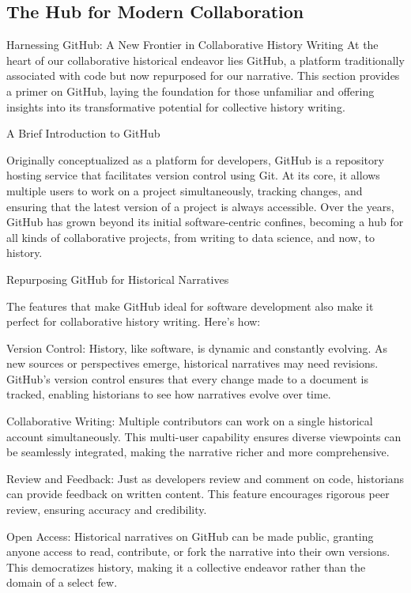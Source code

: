\documentclass[a4paper,12pt]{book}
\begin{document}
\subsection*{The Hub for Modern Collaboration}
Harnessing GitHub: A New Frontier in Collaborative History Writing
At the heart of our collaborative historical endeavor lies GitHub, a platform traditionally associated with code but now repurposed for our narrative. This section provides a primer on GitHub, laying the foundation for those unfamiliar and offering insights into its transformative potential for collective history writing.

A Brief Introduction to GitHub

Originally conceptualized as a platform for developers, GitHub is a repository hosting service that facilitates version control using Git. At its core, it allows multiple users to work on a project simultaneously, tracking changes, and ensuring that the latest version of a project is always accessible. Over the years, GitHub has grown beyond its initial software-centric confines, becoming a hub for all kinds of collaborative projects, from writing to data science, and now, to history.

Repurposing GitHub for Historical Narratives

The features that make GitHub ideal for software development also make it perfect for collaborative history writing. Here's how:

Version Control: History, like software, is dynamic and constantly evolving. As new sources or perspectives emerge, historical narratives may need revisions. GitHub's version control ensures that every change made to a document is tracked, enabling historians to see how narratives evolve over time.

Collaborative Writing: Multiple contributors can work on a single historical account simultaneously. This multi-user capability ensures diverse viewpoints can be seamlessly integrated, making the narrative richer and more comprehensive.

Review and Feedback: Just as developers review and comment on code, historians can provide feedback on written content. This feature encourages rigorous peer review, ensuring accuracy and credibility.

Open Access: Historical narratives on GitHub can be made public, granting anyone access to read, contribute, or fork the narrative into their own versions. This democratizes history, making it a collective endeavor rather than the domain of a select few.
\end{document}
